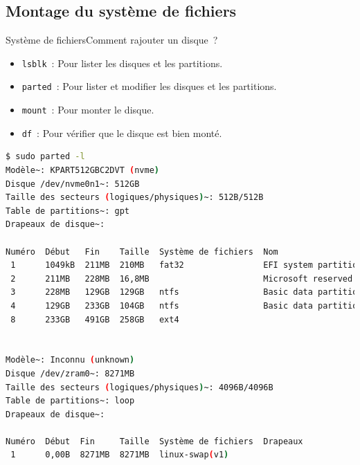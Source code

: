 \documentclass{beamer}
\begin{document}
    \subsection{Montage du système de fichiers}\label{subsec:mount}
    \begin{frame}[fragile]{Système de fichiers}{Comment rajouter un disque~?}
        \begin{scriptsize}
            \begin{itemize}
                \item \lstinline{lsblk}~: Pour lister les disques et les partitions.
                \item \lstinline{parted}~: Pour lister et modifier les disques et les partitions.
                \item \lstinline{mount}~: Pour monter le disque.
                \item \lstinline{df}~: Pour vérifier que le disque est bien monté.
            \end{itemize}
            \begin{lstlisting}[language=bash,basicstyle=\tiny\ttfamily]
$ sudo parted -l
Modèle~: KPART512GBC2DVT (nvme)
Disque /dev/nvme0n1~: 512GB
Taille des secteurs (logiques/physiques)~: 512B/512B
Table de partitions~: gpt
Drapeaux de disque~:

Numéro  Début   Fin    Taille  Système de fichiers  Nom                           Drapeaux
 1      1049kB  211MB  210MB   fat32                EFI system partition          démarrage, esp
 2      211MB   228MB  16,8MB                       Microsoft reserved partition  msftres
 3      228MB   129GB  129GB   ntfs                 Basic data partition          msftdata
 4      129GB   233GB  104GB   ntfs                 Basic data partition          msftdata
 8      233GB   491GB  258GB   ext4


Modèle~: Inconnu (unknown)
Disque /dev/zram0~: 8271MB
Taille des secteurs (logiques/physiques)~: 4096B/4096B
Table de partitions~: loop
Drapeaux de disque~:

Numéro  Début  Fin     Taille  Système de fichiers  Drapeaux
 1      0,00B  8271MB  8271MB  linux-swap(v1)
            \end{lstlisting}
        \end{scriptsize}
    \end{frame}
\end{document}
